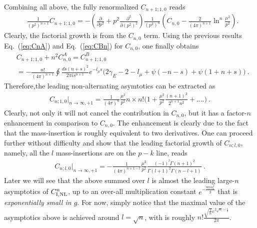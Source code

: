 \documentclass[a4paper,11pt]{article}
\begin{document}
Combining all above, the fully renormalized $C_{n+1;1,0}$ reads
\begin{align}
&\frac{1}{(p^2)^{n+1}}C_{n+1;1,0}=-\left(\frac{\partial}{\partial p^2}+p^2\frac{\partial^2}{\partial(p^2)^2}\right)\frac{1}{(p^2)^n}\left(C_{n,0}-\frac{2}{(4\pi)^{n+1}}\ln^{n}\frac{\mu^2}{p^2}\right) . \label{eq:Cnplus110}
\end{align}
Clearly, the factorial growth is from the $C_{n,0}$ term. Using the previous results Eq.~(\ref{eq:CnA}) and Eq.~(\ref{eq:CBn}) for $C_{n,0}$, one finally obtains
\begin{align}
&C_{n+1;1,0}+n^2C_{n,0}^A=C_{n+1;1,0}^B\nonumber \\
&=-\frac{n!}{(4\pi)^{n+1}}\oint\frac{ds(n+s)^2}{2\pi is^{n+1}}e^{-l_{\mu}s}\bigg(2\gamma_E-2-l_{\mu}+\psi(-n-s)+\psi(1+n+s)\bigg) \ .
\end{align}
Therefore,the leading non-alternating asymtotics can be extracted as 
\begin{align}\label{eq:massfac2}
C_{n;1,0}\bigg|_{n\rightarrow\infty, +1}=\frac{1}{(4\pi)^n}\frac{\mu^2}{p^2} n\times n!\bigg(1+\frac{\mu^2}{p^2}\frac{(n+1)^2}{2^{n+1}n^2}+....\bigg)  \ .
\end{align}
Clearly, not only it will not cancel the contribution in $C_{n,0}$, but it has a factor-$n$ enhancement in comparison to $C_{n,0}$. The enhancement is clearly due to the fact that the mass-insertion is roughly equivalent to two derivatives. One can proceed further without difficulty and show that the leading factorial growth of $C_{n;l,0}$, namely, all the $l$ mass-insertions are on the $p-k$ line, reads
\begin{align}
C_{n;l,0}\bigg|_{n\rightarrow\infty, +1}=-\frac{1}{(4\pi)^{n+1-l}}\frac{\mu^2}{p^2}\frac{(-1)^{l} \Gamma (n+1)^2}{\Gamma (l+1)^2 \Gamma (n-l+1)} \ .
\end{align}
Later we will see that the above summed over $l$ is almost the leading large-$n$ asymptotics of $C_{\rm I,NL}^n$, up to an over-all multiplication constant $e^{-\frac{8\pi m_r^2}{g}}$ that is {\it exponentially small in $g$}. For now, simply notice that the maximal value of the asymptotics above is achieved around $l=\sqrt{n}$, with is roughly $n!\frac{\sqrt{\frac{1}{n}}e^{2\sqrt{n}-\frac{1}{2}}}{2\pi}$.
\end{document}
